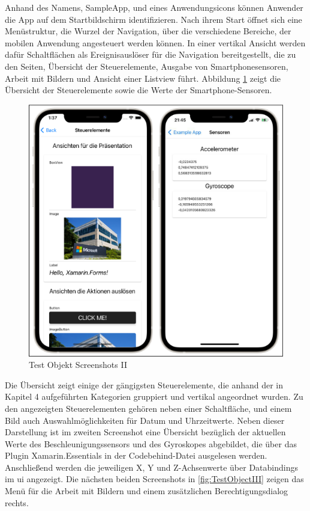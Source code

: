 Anhand des Namens,  SampleApp,  und eines Anwendungsicons können Anwender die App auf dem Startbildschirm identifizieren.  Nach ihrem Start öffnet sich eine Menüstruktur,  die Wurzel der Navigation, über die verschiedene Bereiche, der mobilen Anwendung angesteuert werden können.  In einer vertikal Ansicht werden dafür Schaltflächen als Ereignisauslöser für die Navigation bereitgestellt,  die zu den Seiten, Übersicht der Steuerelemente,  Ausgabe von Smartphonesensoren,  Arbeit mit Bildern und Ansicht einer Listview führt.   Abbildung \ref{fig:TestObjectII} zeigt die Übersicht der Steuerelemente sowie die Werte der Smartphone-Sensoren.

\begin{figure}[!ht]
 \includegraphics[width=\textwidth,keepaspectratio]{Images/Screenshot/Sensors.png}
 \caption{Test Objekt Screenshots II}
 \label{fig:TestObjectII}
\end{figure}
Die Übersicht zeigt einige der gängigsten Steuerelemente, die anhand der in Kapitel 4 aufgeführten 
Kategorien gruppiert und vertikal angeordnet wurden.  Zu den angezeigten Steuerelementen gehören neben einer Schaltfläche,  und einem Bild auch Auswahlmöglichkeiten für Datum und Uhrzeitwerte.  Neben dieser Darstellung ist im zweiten Screenshot eine Übersicht bezüglich der aktuellen Werte des Beschleunigungssensors und des Gyroskopes abgebildet,  die über das Plugin Xamarin.Essentials in der Codebehind-Datei ausgelesen werden. Anschließend werden die jeweiligen X, Y und Z-Achsenwerte über Databindings im \ac{ui} angezeigt.  Die nächsten beiden Screenshots in \ref{fig:TestObjectIII} zeigen das Menü für die Arbeit mit Bildern und einem zusätzlichen Berechtigungsdialog rechts.

